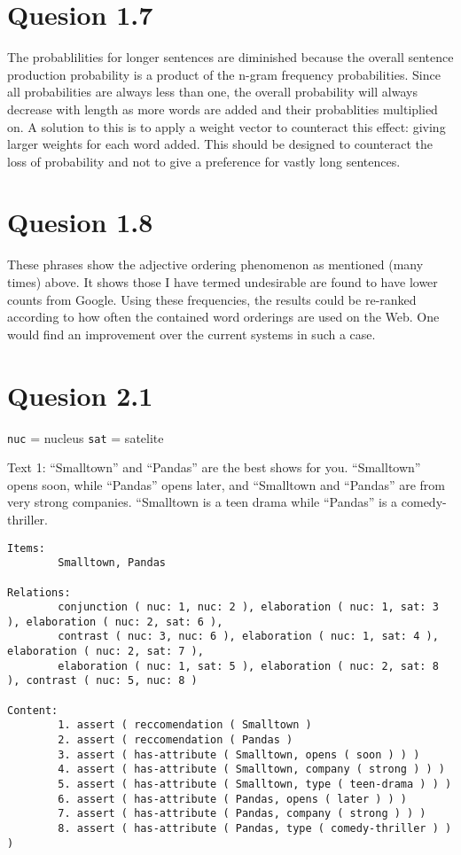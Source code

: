 \documentclass[a4paper,11pt,oneside]{article}
\begin{document}
\section{Quesion 1.7}
The probablilities for longer sentences are diminished because the overall sentence production probability is a product of the n-gram frequency probabilities. Since all probabilities are always less than one, the overall probability will always decrease with length as more words are added and their probablities multiplied on. A solution to this is to apply a weight vector to counteract this effect: giving larger weights for each word added. This should be designed to counteract the loss of probability and not to give a preference for vastly long sentences.

\section{Quesion 1.8}
These phrases show the adjective ordering phenomenon as mentioned (many times) above. It shows those I have termed undesirable are found to have lower counts from Google. Using these frequencies, the results could be re-ranked according to how often the contained word orderings are used on the Web. One would find an improvement over the current systems in such a case.

\section{Quesion 2.1}
\verb+nuc+ = nucleus \verb+sat+ = satelite

Text 1:
“Smalltown” and “Pandas” are the best shows for you. “Smalltown” opens soon, while “Pandas” opens later, and “Smalltown and “Pandas” are from very strong companies. “Smalltown is a teen drama while “Pandas” is a comedy-thriller.
\begin{verbatim}
Items:
        Smalltown, Pandas

Relations:
        conjunction ( nuc: 1, nuc: 2 ), elaboration ( nuc: 1, sat: 3 ), elaboration ( nuc: 2, sat: 6 ),
        contrast ( nuc: 3, nuc: 6 ), elaboration ( nuc: 1, sat: 4 ), elaboration ( nuc: 2, sat: 7 ),
        elaboration ( nuc: 1, sat: 5 ), elaboration ( nuc: 2, sat: 8 ), contrast ( nuc: 5, nuc: 8 )
        
Content:
        1. assert ( reccomendation ( Smalltown )
        2. assert ( reccomendation ( Pandas )
        3. assert ( has-attribute ( Smalltown, opens ( soon ) ) )
        4. assert ( has-attribute ( Smalltown, company ( strong ) ) )
        5. assert ( has-attribute ( Smalltown, type ( teen-drama ) ) )
        6. assert ( has-attribute ( Pandas, opens ( later ) ) )
        7. assert ( has-attribute ( Pandas, company ( strong ) ) )
        8. assert ( has-attribute ( Pandas, type ( comedy-thriller ) ) )
\end{verbatim}
\end{document}
